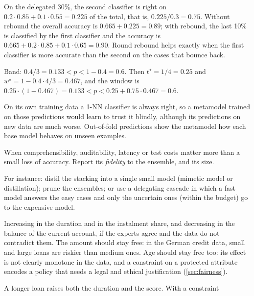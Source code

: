 \begin{description}[font=\bfseries,leftmargin=0pt,itemsep=5pt]
  \item[\ref{exr2:rebound}] On the delegated 30\%, the second classifier is right on
        $0.2\cdot0.85+0.1\cdot0.55=0.225$ of the total, that is, $0.225/0.3=0.75$. Without rebound the
        overall accuracy is $0.665+0.225=0.89$; with rebound, the last 10\% is classified by the
        first classifier and the accuracy is $0.665+0.2\cdot0.85+0.1\cdot0.65=0.90$. Round rebound
        helps exactly when the first classifier is more accurate than the second on the cases that
        bounce back.
  \item[\ref{exr2:window}] Band: $0.4/3=0.133<p<1-0.4=0.6$. Then $t^\star=1/4=0.25$ and
        $w^\star=1-0.4\cdot4/3=0.467$, and the window is $0.25\cdot(1-0.467)=0.133<p<0.25+0.75\cdot0.467=0.6$.
  \item[\ref{exr2:stacking}] On its own training data a 1-NN classifier is always right, so a
        metamodel trained on those predictions would learn to trust it blindly, although its
        predictions on new data are much worse. Out-of-fold predictions show the metamodel how each
        base model behaves on unseen examples.
  \item[\ref{exr2:mimetic}] When comprehensibility, auditability, latency or test costs matter more
        than a small loss of accuracy. Report its \emph{fidelity} to the ensemble, and its size.
  \item[\ref{exr2:design}] For instance: distil the stacking into a single small model (mimetic
        model or distillation); prune the ensembles; or use a delegating cascade in which a fast
        model answers the easy cases and only the uncertain ones (within the budget) go to the
        expensive model.
\item[\ref{exr2:monotone}] Increasing in the duration and in the instalment share, and decreasing
in the balance of the current account, if the experts agree and the data do not contradict
them. The amount should stay free: in the German credit data, small and large loans are
riskier than medium ones. Age should stay free too: its effect is not clearly monotone in the
data, and a constraint on a protected attribute encodes a policy that needs a legal
and ethical justification (\cref{sec:fairness}).
\item[\ref{exr2:knowledge}] A longer loan raises both the duration and the score. With a constraint

\end{description}
